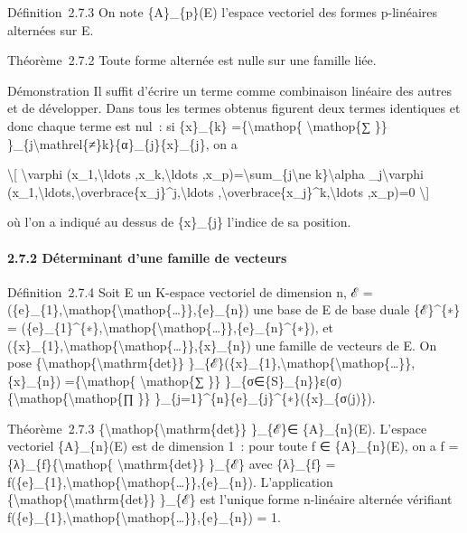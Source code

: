 \documentclass[]{article}
\begin{document}
Définition~2.7.3 On note \{A\}\_\{p\}(E) l'espace vectoriel des formes
p-linéaires alternées sur E.

Théorème~2.7.2 Toute forme alternée est nulle sur une famille liée.

Démonstration Il suffit d'écrire un terme comme combinaison linéaire des
autres et de développer. Dans tous les termes obtenus figurent deux
termes identiques et donc chaque terme est nul~: si \{x\}\_\{k\}
=\{\textbackslash{}mathop\{ \textbackslash{}mathop\{∑ \}\}
\}\_\{j\textbackslash{}mathrel\{≠\}k\}\{α\}\_\{j\}\{x\}\_\{j\}, on a

\textbackslash{}{[} \textbackslash{}varphi (x\_1,\textbackslash{}ldots
,x\_k,\textbackslash{}ldots
,x\_p)=\textbackslash{}sum\_\{j\textbackslash{}ne
k\}\textbackslash{}alpha \_j\textbackslash{}varphi
(x\_1,\textbackslash{}ldots,\textbackslash{}overbrace\{x\_j\}\^{}j,\textbackslash{}ldots
,\textbackslash{}overbrace\{x\_j\}\^{}k,\textbackslash{}ldots ,x\_p)=0
\textbackslash{}{]}

où l'on a indiqué au dessus de \{x\}\_\{j\} l'indice de sa position.

\paragraph{2.7.2 Déterminant d'une famille de vecteurs}

Définition~2.7.4 Soit E un K-espace vectoriel de dimension n, ℰ =
(\{e\}\_\{1\},\textbackslash{}mathop\{\textbackslash{}mathop\{\ldots{}\}\},\{e\}\_\{n\})
une base de E de base duale \{ℰ\}\^{}\{∗\} =
(\{e\}\_\{1\}\^{}\{∗\},\textbackslash{}mathop\{\textbackslash{}mathop\{\ldots{}\}\},\{e\}\_\{n\}\^{}\{∗\}),
et
(\{x\}\_\{1\},\textbackslash{}mathop\{\textbackslash{}mathop\{\ldots{}\}\},\{x\}\_\{n\})
une famille de vecteurs de E. On pose
\{\textbackslash{}mathop\{\textbackslash{}mathrm\{det\}\}
\}\_\{ℰ\}(\{x\}\_\{1\},\textbackslash{}mathop\{\textbackslash{}mathop\{\ldots{}\}\},\{x\}\_\{n\})
=\{\textbackslash{}mathop\{ \textbackslash{}mathop\{∑ \}\}
\}\_\{σ∈\{S\}\_\{n\}\}ε(σ)\{\textbackslash{}mathop\{\textbackslash{}mathop\{∏
\}\} \}\_\{j=1\}\^{}\{n\}\{e\}\_\{j\}\^{}\{∗\}(\{x\}\_\{σ(j)\}).

Théorème~2.7.3 \{\textbackslash{}mathop\{\textbackslash{}mathrm\{det\}\}
\}\_\{ℰ\}∈ \{A\}\_\{n\}(E). L'espace vectoriel \{A\}\_\{n\}(E) est de
dimension 1~: pour toute f ∈ \{A\}\_\{n\}(E), on a f =
\{λ\}\_\{f\}\{\textbackslash{}mathop\{ \textbackslash{}mathrm\{det\}\}
\}\_\{ℰ\} avec \{λ\}\_\{f\} =
f(\{e\}\_\{1\},\textbackslash{}mathop\{\textbackslash{}mathop\{\ldots{}\}\},\{e\}\_\{n\}).
L'application \{\textbackslash{}mathop\{\textbackslash{}mathrm\{det\}\}
\}\_\{ℰ\} est l'unique forme n-linéaire alternée vérifiant
f(\{e\}\_\{1\},\textbackslash{}mathop\{\textbackslash{}mathop\{\ldots{}\}\},\{e\}\_\{n\})
= 1.
\end{document}
